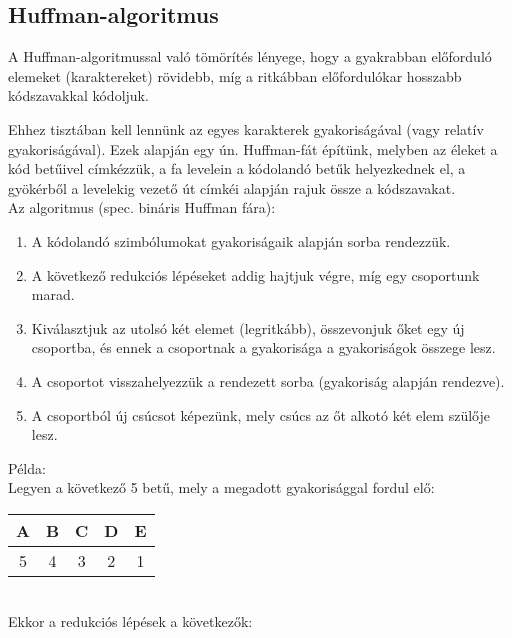 \documentclass[margin=0px]{article}
\begin{document}
\subsection{Huffman-algoritmus}
A Huffman-algoritmussal való tömörítés lényege, hogy a gyakrabban előforduló elemeket (karaktereket) rövidebb, míg a ritkábban előfordulókar hosszabb kódszavakkal kódoljuk.

Ehhez tisztában kell lennünk az egyes karakterek gyakoriságával (vagy relatív gyakoriságával). Ezek alapján  egy ún. Huffman-fát építünk, melyben az éleket a kód betűivel címkézzük, a fa levelein a kódolandó betűk helyezkednek el, a gyökérből a levelekig vezető út címkéi alapján rajuk össze a kódszavakat.\\

\noindent
Az algoritmus (spec. bináris Huffman fára):
\begin{enumerate}
    \item A kódolandó szimbólumokat gyakoriságaik alapján sorba rendezzük.
    \item A következő redukciós lépéseket addig hajtjuk végre, míg egy csoportunk marad.
    \item Kiválasztjuk az utolsó két elemet (legritkább), összevonjuk őket egy új csoportba, és ennek a csoportnak a gyakorisága a gyakoriságok összege lesz.
    \item A csoportot visszahelyezzük a rendezett sorba (gyakoriság alapján rendezve).
    \item A csoportból új csúcsot képezünk, mely csúcs az őt alkotó két elem szülője lesz.
\end{enumerate}

\noindent
Példa:\\
Legyen a következő 5 betű, mely a megadott gyakorisággal fordul elő:\\

\begin{tabular}{|c|c|c|c|c|}
    \hline A & B & C & D & E \\
    \hline 5 & 4 & 3 & 2 & 1 \\
    \hline
\end{tabular}\\

Ekkor a redukciós lépések a következők:
\end{document}
